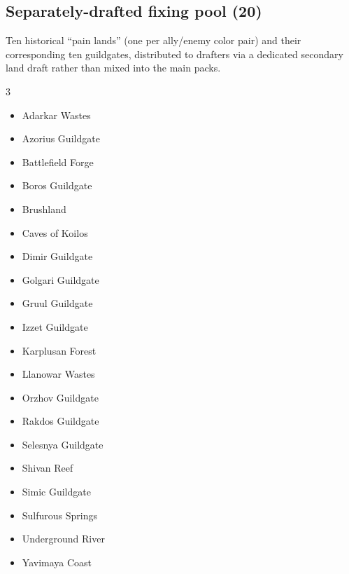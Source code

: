 \documentclass[11pt]{article}
\begin{document}
\subsection*{Separately-drafted fixing pool (20)}
\label{tab:fixingpool}
Ten historical ``pain lands'' (one per ally/enemy color pair) and their corresponding ten guildgates, distributed to drafters via a dedicated secondary land draft rather than mixed into the main packs.
\begin{multicols}{3}
\footnotesize
\begin{itemize}[leftmargin=1em,itemsep=0pt,parsep=0pt]
\item Adarkar Wastes
\item Azorius Guildgate
\item Battlefield Forge
\item Boros Guildgate
\item Brushland
\item Caves of Koilos
\item Dimir Guildgate
\item Golgari Guildgate
\item Gruul Guildgate
\item Izzet Guildgate
\item Karplusan Forest
\item Llanowar Wastes
\item Orzhov Guildgate
\item Rakdos Guildgate
\item Selesnya Guildgate
\item Shivan Reef
\item Simic Guildgate
\item Sulfurous Springs
\item Underground River
\item Yavimaya Coast
\end{itemize}
\end{multicols}
\end{document}
